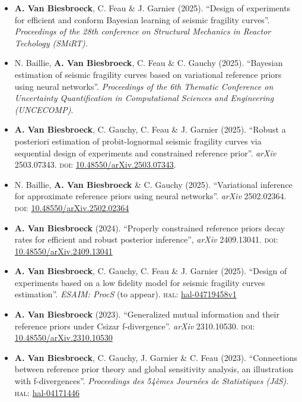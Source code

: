 \begin{itemize}
    \item \textbf{A. Van Biesbroeck}, C. Feau \& J. Garnier (2025). ``Design of experiments for efficient and conform Bayesian learning of seismic fragility curves''. \emph{Proceedings of the 28th conference on Structural Mechanics in Reactor Techology (SMiRT).}
    \item N. Baillie, \textbf{A. Van Biesbroeck}, C. Feau \& C. Gauchy (2025). ``Bayesian estimation of seismic fragility curves based on variational reference priors using neural networks''. \emph{Proceedings of the 6th Thematic Conference on Uncertainty Quantification in Computational Sciences and Engineering (UNCECOMP)}.
    \item \textbf{A. Van Biesbroeck}, C. Gauchy, C. Feau \& J. Garnier (2025). ``Robust a posteriori estimation of probit-lognormal seismic fragility curves via sequential design of experiments and constrained reference prior''. \emph{arXiv} 2503.07343. \textsc{doi:} \href{https://dx.doi.org/10.48550/arXiv.2503.07343}{10.48550/arXiv.2503.07343}.
    \item N. Baillie, \textbf{A. Van Biesbroeck} \& C. Gauchy (2025). ``Variational inference for approximate reference priors using neural networks''. \emph{arXiv} 2502.02364. \textsc{doi:} \href{https://dx.doi.org/10.48550/arXiv.2502.02364}{10.48550/arXiv.2502.02364}
    \item \textbf{A. Van Biesbroeck} (2024). ``Properly constrained reference priors decay rates for efficient and robust posterior inference'', \emph{arXiv} 2409.13041. \textsc{doi:} \href{https://dx.doi.org/10.48550/arXiv.2409.13041}{10.48550/arXiv.2409.13041}
    \item \textbf{A. Van Biesbroeck}, C. Gauchy, C. Feau \& J. Garnier (2025). ``Design of experiments based on a low fidelity model for seismic fragility curves estimation''. \emph{ESAIM: ProcS} (to appear). \textsc{hal:} \href{https://hal.science/hal-04719458v1}{hal-04719458v1}
    \item \textbf{A. Van Biesbroeck} (2023). ``Generalized mutual information and their reference priors under Csizar f-divergence''. \emph{arXiv} 2310.10530. \textsc{doi:} \href{https://dx.doi.org/10.48550/arXiv.2310.10530}{10.48550/arXiv.2310.10530}
    \item \textbf{A. Van Biesbroeck}, C. Gauchy, J. Garnier \& C. Feau (2023). ``Connections between reference prior theory and global sensitivity analysis, an illustration with f-divergences''. \emph{Proceedings des 54èmes Journées de Statistiques (JdS)}. \textsc{hal:} \href{https://hal.science/hal-04171446}{hal-04171446}

\end{itemize}
